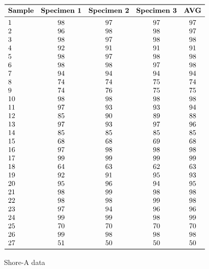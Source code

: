 \documentclass[a4paper, 11pt]{article}
\begin{document}
\begin{appendices}
\begin{table}[htp]
	\centering
	$
	\begin{array}{lcccc}
	\toprule
	\textbf{Sample} & \textbf{Specimen 1} & \textbf{Specimen 2} & \textbf{Specimen 3} & \textbf{AVG} \\
	\midrule
	1&98&97&97&97\\
2&96&98&98&97\\
3&98&97&98&98\\
4&92&91&91&91\\
5&98&97&98&98\\
6&98&98&97&98\\
7&94&94&94&94\\
8&74&74&75&74\\
9&74&76&75&75\\
10&98&98&98&98\\
11&97&93&93&94\\
12&85&90&89&88\\
13&97&93&97&96\\
14&85&85&85&85\\
15&68&68&69&68\\
16&97&98&98&98\\
17&99&99&99&99\\
18&64&63&62&63\\
19&92&91&95&93\\
20&95&96&94&95\\
21&98&99&98&98\\
22&98&98&99&98\\
23&97&94&96&96\\
24&99&99&98&99\\
25&70&70&70&70\\
26&99&98&98&98\\
27&51&50&50&50\\
	\bottomrule
	\end{array}
	$
	\caption{Shore-A data}
	\label{tab:shorea}
\end{table}

\end{appendices}
\end{document}
